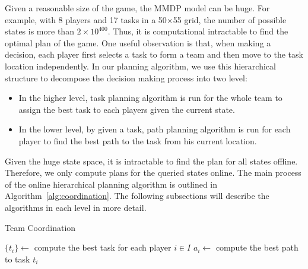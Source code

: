 \documentclass{aamas2014}
\begin{document}
Given a reasonable size of the game, the MMDP model can be huge.
For example, with 8 players and 17 tasks in a 50$\times$55 grid,
the number of possible states is more than $2\times 10^{400}$.
Thus, it is computational intractable to find the optimal plan of
the game. One useful observation is that, when making a decision,
each player first selects a task to form a team and then move to
the task location independently. In our planning algorithm, we use
this hierarchical structure to decompose the decision making
process into two level:
\begin{itemize}
  \item In the higher level, task planning algorithm is run for
      the whole team to assign the best task to each players
      given the current state.
  \item In the lower level, by given a task, path planning
      algorithm is run for each player to find the best path to
      the task from his current location.
\end{itemize}
Given the huge state space, it is intractable to find the plan for
all states offline. Therefore, we only compute plans for the
queried states online. The main process of the online hierarchical
planning algorithm is outlined in Algorithm~\ref{alg:coordination}.
The following subsections will describe the algorithms in each
level in more detail.

\begin{algorithm}[t]
  \caption{Team Coordination}
  $\{ t_i \} \gets$ compute the best task for each player $i\in I$ \;
   {
    $a_i \gets$ compute the best path to task $t_i$ \;
  }
  \label{alg:coordination}
\end{algorithm}
\end{document}
